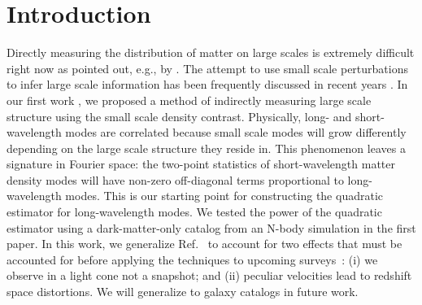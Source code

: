 \documentclass[prd,amsmath,amssymb,floatfix,superscriptaddress,nofootinbib,twocolumn]{revtex4-1}
\begin{document}
\section{Introduction} \label{sec1}
\noindent Directly measuring the distribution of matter on large scales is extremely difficult right now as pointed out, e.g., by \cite{Modi:2019hydr}. The attempt to use small scale perturbations to infer large scale information has been frequently discussed in recent years \cite{Baldauf:2011fer}\cite{Jeong:2012foss}\cite{Li:2014ssc}\cite{Zhu:2016tidal}\cite{Barreira:2017res}. In our first work \cite{Li:2020fir}, we proposed a method of indirectly measuring large scale structure using the small scale density contrast. Physically, long- and short-wavelength modes are correlated because small scale modes will grow differently depending on the large scale structure they reside in. This phenomenon leaves a signature in Fourier space: the two-point statistics of short-wavelength matter density modes will have non-zero off-diagonal terms proportional to long-wavelength modes. This is our starting point for constructing the quadratic estimator for long-wavelength modes. We tested the power of the quadratic estimator using a dark-matter-only catalog from an N-body simulation in the first paper. In this work, we generalize Ref.~\cite{Li:2020fir} to account for two effects that must be accounted for before applying the techniques to upcoming surveys~\cite{LSST:2012ls}\cite{Wfirst:2012jg}\cite{DESI:2019ds}: (i) we observe in a light cone not a snapshot; and (ii) peculiar velocities lead to redshift space distortions. We will generalize to galaxy catalogs in future work.

\end{document}
